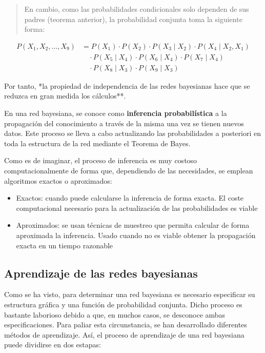 \documentclass[
  a4paper,
  DIV=11,
  numbers=noendperiod]{scrreprt}
\providecommand{\tightlist}{%
  \setlength{\itemsep}{0pt}\setlength{\parskip}{0pt}}\usepackage{longtable,booktabs,array}
\begin{document}
\begin{quote}
En cambio, como las probabilidades condicionales solo dependen de sus
padres (teorema anterior), la probabilidad conjunta toma la siguiente
forma:
\end{quote}

\begin{align}
P(X_1, X_2, \ldots, X_9) &= P(X_1) \cdot P(X_2) \cdot P(X_3 \mid X_2) \cdot P(X_4 \mid X_2, X_1) \\
&\quad \cdot P(X_5 \mid X_4) \cdot P(X_6 \mid X_4) \cdot P(X_7 \mid X_4) \\
&\quad \cdot P(X_8 \mid X_3) \cdot P(X_9 \mid X_3)
\end{align}

Por tanto, *la propiedad de independencia de las redes bayesianas hace
que se reduzca en gran medida los cálculos**.

En una red bayesiana, se conoce como \textbf{inferencia probabilística}
a la propagación del conocimiento a través de la misma una vez se tienen
nuevos datos. Este proceso se lleva a cabo actualizando las
probabilidades a posteriori en toda la estructura de la red mediante el
Teorema de Bayes.

Como es de imaginar, el proceso de inferencia es muy costoso
computacionalmente de forma que, dependiendo de las necesidades, se
emplean algoritmos exactos o aproximados:

\begin{itemize}
\tightlist
\item
  Exactos: cuando puede calcularse la inferencia de forma exacta. El
  coste computacional necesario para la actualización de las
  probabilidades es viable
\item
  Aproximados: se usan técnicas de muestreo que permita calcular de
  forma aproximada la inferencia. Usado cuando no es viable obtener la
  propagación exacta en un tiempo razonable
\end{itemize}

\subsection{Aprendizaje de las redes
bayesianas}\label{aprendizaje-de-las-redes-bayesianas}

Como se ha visto, para determinar una red bayesiana es necesario
especificar su estructura gráfica y una función de probabilidad
conjunta. Dicho proceso es bastante laborioso debido a que, en muchos
casos, se desconoce ambas especificaciones. Para paliar esta
circunstancia, se han desarrollado diferentes métodos de aprendizaje.
Así, el proceso de aprendizaje de una red bayesiana puede dividirse en
dos estapas:
\end{document}
